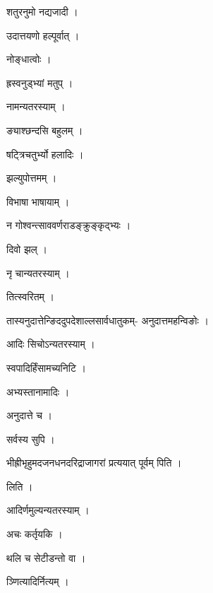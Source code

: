 \documentclass[10pt, openany]{book}
\begin{document}
\noindent शतुरनुमो नद्यजादी ।

\noindent उदात्तयणो हल्पूर्वात् ।

\noindent नोङ्धात्वोः ।

\noindent ह्रस्वनुड्भ्यां मतुप् ।

\noindent नामन्यतरस्याम् ।

\noindent ङ्याश्छन्दसि बहुलम् ।

\noindent षट्त्रिचतुर्भ्यो हलादिः ।

\noindent झल्युपोत्तमम् ।

\noindent विभाषा भाषायाम् ।

\noindent न गोश्वन्त्साववर्णराडङ्क्रुङ्कृद्भ्यः ।

\noindent दिवो झल् ।

\noindent नृ चान्यतरस्याम् ।

\noindent तित्स्वरितम् ।

\noindent तास्यनुदात्तेन्ङिददुपदेशाल्लसार्वधातुकम्- अनुदात्तमहन्विङोः ।

\noindent आदिः सिचोऽन्यतरस्याम् ।

\noindent स्वपादिर्हिंसामच्यनिटि ।

\noindent अभ्यस्तानामादिः ।

\noindent अनुदात्ते च ।

\noindent सर्वस्य सुपि ।

\noindent भीह्रीभृहुमदजनधनदरिद्राजागरां प्रत्ययात् पूर्वम् पिति ।

\noindent लिति ।

\noindent आदिर्णमुल्यन्यतरस्याम् ।

\noindent अचः कर्तृयकि ।

\noindent थलि च सेटीडन्तो वा ।

\noindent ञ्णित्यादिर्नित्यम् ।
\end{document}
